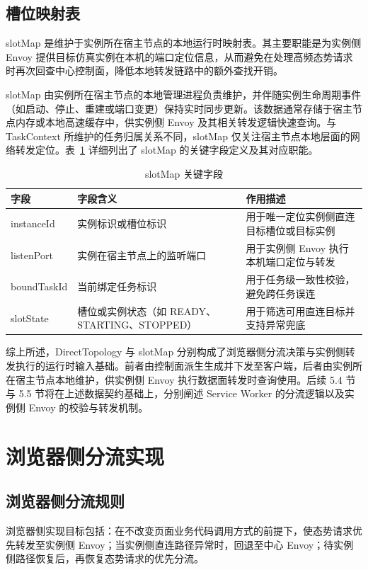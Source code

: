 \documentclass[lang=chs, degree=master, blindreview=true, winfonts=true, academic=false]{yanputhesis}
\begin{document}
\subsection{槽位映射表}
slotMap 是维护于实例所在宿主节点的本地运行时映射表。其主要职能是为实例侧 Envoy 提供目标仿真实例在本机的端口定位信息，从而避免在处理高频态势请求时再次回查中心控制面，降低本地转发链路中的额外查找开销。

slotMap 由实例所在宿主节点的本地管理进程负责维护，并伴随实例生命周期事件（如启动、停止、重建或端口变更）保持实时同步更新。该数据通常存储于宿主节点内存或本地高速缓存中，供实例侧 Envoy 及其相关转发逻辑快速查询。与 TaskContext 所维护的任务归属关系不同，slotMap 仅关注宿主节点本地层面的网络转发定位。表~\ref{tab:5_4_slotmap_definition} 详细列出了 slotMap 的关键字段定义及其对应职能。
\begin{table}[!h]
    \centering
    \caption{slotMap 关键字段}
    \label{tab:5_4_slotmap_definition}
    \begin{tabularx}{\textwidth}{>{\centering\arraybackslash}p{}
                                  >{\centering\arraybackslash}p{}
                                  >{\centering\arraybackslash}X}
        \toprule
        字段 & 字段含义 & 作用描述 \\ \midrule
        instanceId & 实例标识或槽位标识 & 用于唯一定位实例侧直连目标槽位或目标实例 \\
        listenPort & 实例在宿主节点上的监听端口 & 用于实例侧 Envoy 执行本机端口定位与转发 \\
        boundTaskId & 当前绑定任务标识 & 用于任务级一致性校验，避免跨任务误连 \\
        slotState & 槽位或实例状态（如 READY、STARTING、STOPPED） & 用于筛选可用直连目标并支持异常兜底 \\
        \bottomrule
    \end{tabularx}
\end{table}

综上所述，DirectTopology 与 slotMap 分别构成了浏览器侧分流决策与实例侧转发执行的运行时输入基础。前者由控制面派生生成并下发至客户端，后者由实例所在宿主节点本地维护，供实例侧 Envoy 执行数据面转发时查询使用。后续 5.4 节与 5.5 节将在上述数据契约基础上，分别阐述 Service Worker 的分流逻辑以及实例侧 Envoy 的校验与转发机制。
\section{浏览器侧分流实现}
\subsection{浏览器侧分流规则}
浏览器侧实现目标包括：在不改变页面业务代码调用方式的前提下，使态势请求优先转发至实例侧 Envoy；当实例侧直连路径异常时，回退至中心 Envoy；待实例侧路径恢复后，再恢复态势请求的优先分流。
\end{document}

